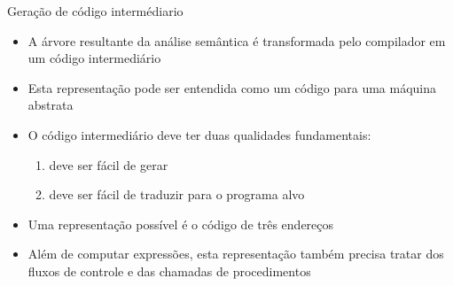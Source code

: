 \begin{frame}[fragile]{Geração de código intermédiario}

    \begin{itemize}
        \item A árvore resultante da análise semântica é transformada pelo compilador em um código intermediário
        \pause

        \item Esta representação pode ser entendida como um código para uma máquina abstrata
        \pause

        \item O código intermediário deve ter duas qualidades fundamentais:
        \pause
        \begin{enumerate}
            \item deve ser fácil de gerar
            \pause

            \item deve ser fácil de traduzir para o programa alvo
        \end{enumerate}
        \pause

        \item Uma representação possível é o código de três endereços
        \pause

        \item Além de computar expressões, esta representação também precisa tratar dos fluxos de controle e das chamadas de procedimentos
    \end{itemize}

\end{frame}

